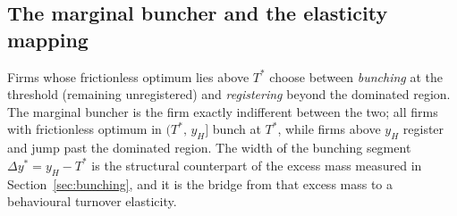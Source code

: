 \subsection{The marginal buncher and the elasticity mapping}
\label{ssec:buncher}

Firms whose frictionless optimum lies above $T^{*}$ choose between
\emph{bunching} at the threshold (remaining unregistered) and \emph{registering}
beyond the dominated region. The marginal buncher is the firm exactly indifferent
between the two; all firms with frictionless optimum in $(T^{*},\,y_H]$ bunch at
$T^{*}$, while firms above $y_H$ register and jump past the dominated region. The
width of the bunching segment $\Delta y^{*}=y_H-T^{*}$ is the structural
counterpart of the excess mass measured in Section~\ref{sec:bunching}, and it is
the bridge from that excess mass to a behavioural turnover elasticity.

